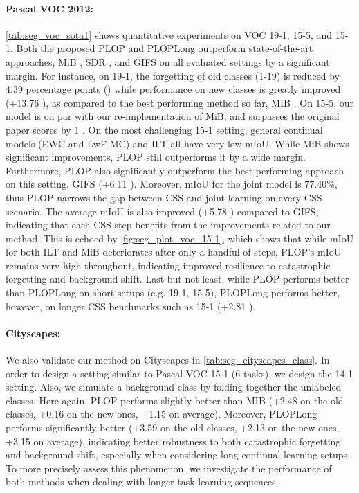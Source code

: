 \paragraph{Pascal VOC 2012:\,}\autoref{tab:seg_voc_sota1} shows quantitative experiments on
VOC 19-1, 15-5, and 15-1. Both the proposed PLOP and PLOPLong outperform state-of-the-art
approaches, MiB \cite{cermelli2020modelingthebackground}, SDR \cite{michieli2021sdr}, and GIFS
\cite{cermelli2020fewshotcontinualsegm} on all evaluated settings by a significant margin. For
instance, on 19-1, the forgetting of old classes (1-19) is reduced by 4.39 percentage points (\pp)
while performance on new classes is greatly improved (+13.76 \pp), as compared to the best
performing method so far, MIB \cite{cermelli2020modelingthebackground}. On 15-5, our model is on par
with our re-implementation of MiB, and surpasses the original paper scores
\cite{cermelli2020modelingthebackground} by 1 \pp. On the most challenging 15-1 setting, general
continual models (EWC and LwF-MC) and ILT all have very low \ac{mIoU}. While MiB shows significant
improvements, PLOP still outperforms it by a wide margin. Furthermore, PLOP also significantly
outperform the best performing approach on this setting, GIFS
\cite{cermelli2020fewshotcontinualsegm} (+6.11 \pp). Moreover, \ac{mIoU} for the joint model is
$77.40\%$, thus PLOP narrows the gap between \ac{CSS} and joint learning on every \ac{CSS} scenario. The
average \ac{mIoU} is also improved (+5.78 \pp) compared to GIFS, indicating that each \ac{CSS} step
benefits from the improvements related to our method. This is echoed by
\autoref{fig:seg_plot_voc_15-1}, which shows that while \ac{mIoU} for both ILT and MiB deteriorates
after only a handful of steps, PLOP's \ac{mIoU} remains very high throughout, indicating improved
resilience to catastrophic forgetting and background shift. Last but not least, while PLOP performs
better than PLOPLong on short setups (e.g. 19-1, 15-5), PLOPLong performs better, however, on longer
\ac{CSS} benchmarks such as 15-1 (+2.81 \pp).



\paragraph{Cityscapes:\,}We also validate our method on Cityscapes in
\autoref{tab:seg_cityscapes_class}. In order to design a setting similar to Pascal-VOC 15-1 (6
tasks), we design the 14-1 setting. Also, we simulate a background class by folding together the
unlabeled classes. Here again, PLOP performs slightly better than MIB (+2.48 \pp on the old classes,
+0.16 \pp on the new ones, +1.15 \pp on average). Moreover, PLOPLong performs significantly better
(+3.59 \pp on the old classes, +2.13 \pp on the new ones, +3.15 \pp on average), indicating better
robustness to both catastrophic forgetting and background shift, especially when considering long
continual learning setups. To more precisely assess this phenomenon, we investigate the performance
of both methods when dealing with longer task learning sequences.

